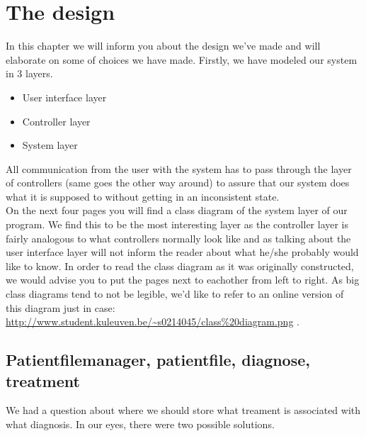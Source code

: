 \documentclass[11pt]{article}
\begin{document}
\section{The design}
In this chapter we will inform you about the design we've made and will elaborate on some of choices we have made. Firstly, we have modeled our system in 3 layers. 
\begin{itemize}
\item{User interface layer}
\item{Controller layer}
\item{System layer}
\end{itemize}
All communication from the user with the system has to pass through the layer of controllers (same goes the other way around) to assure that our system does what it is supposed to without getting in an inconsistent state.
\\On the next four pages you will find a class diagram of the system layer of our program. We find this to be the most interesting layer as the controller layer is fairly analogous to what controllers normally look like and as talking about the user interface layer will not inform the reader about what he/she probably would like to know. In order to read the class diagram as it was originally constructed, we would advise you to put the pages next to eachother from left to right. As big class diagrams tend to not be legible, we'd like to refer to an online version of this diagram just in case: \url{http://www.student.kuleuven.be/~s0214045/class%20diagram.png} .\\

\subsection{Patientfilemanager, patientfile, diagnose, treatment}
We had a question about where we should store what treament is associated with what diagnosis. In our eyes, there were two possible solutions.
\end{document}
